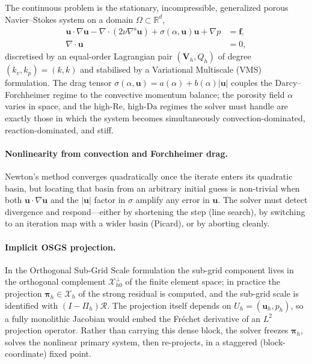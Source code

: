\documentclass{article}
\begin{document}
The continuous problem is the stationary, incompressible, generalized
porous Navier--Stokes system on a domain $\Omega \subset \mathbb{R}^d$,
\begin{equation}
    \label{eq:strong}
    \begin{aligned}
    \boldsymbol{u} \cdot \nabla \boldsymbol{u}
        - \nabla \cdot (2 \nu \nabla^{\mathrm{s}} \boldsymbol{u})
        + \sigma(\alpha, \boldsymbol{u}) \boldsymbol{u}
        + \nabla p
        &= \boldsymbol{f}, \\
    \nabla \cdot \boldsymbol{u} &= 0,
    \end{aligned}
\end{equation}
discretised by an equal-order Lagrangian pair $(\boldsymbol{V}_h, Q_h)$
of degree $(k_v, k_p) = (k, k)$ and stabilised by a Variational
Multiscale (VMS) formulation. The drag tensor
$\sigma(\alpha, \boldsymbol{u}) = a(\alpha) + b(\alpha) |\boldsymbol{u}|$
couples the Darcy--Forchheimer regime to the convective momentum
balance; the porosity field $\alpha$ varies in space, and the
high-$\mathrm{Re}$, high-$\mathrm{Da}$ regimes the solver must handle
are exactly those in which the system becomes simultaneously
convection-dominated, reaction-dominated, and stiff.

\paragraph{Nonlinearity from convection and Forchheimer drag.}  Newton's
method converges quadratically once the iterate enters its quadratic
basin, but locating that basin from an arbitrary initial guess is
non-trivial when both $\boldsymbol{u}\cdot\nabla\boldsymbol{u}$ and the
$|\boldsymbol{u}|$ factor in $\sigma$ amplify any error in
$\boldsymbol{u}$. The solver must detect divergence and respond---either
by shortening the step (line search), by switching to an iteration map
with a wider basin (Picard), or by aborting cleanly.

\paragraph{Implicit OSGS projection.}  In the Orthogonal Sub-Grid Scale
formulation the sub-grid component lives in the orthogonal complement
$\mathcal{X}_{h0}^{\perp}$ of the finite element space; in practice the
projection $\boldsymbol{\pi}_h \in \mathcal{X}_h$ of the strong residual
is computed, and the sub-grid scale is identified with
$(I-\Pi_h)\mathcal{R}$. The projection itself depends on
$U_h = (\boldsymbol{u}_h, p_h)$, so a fully monolithic Jacobian would
embed the Fr\'echet derivative of an $L^2$ projection operator. Rather
than carrying this dense block, the solver freezes $\boldsymbol{\pi}_h$,
solves the nonlinear primary system, then re-projects, in a staggered
(block-coordinate) fixed point.
\end{document}
